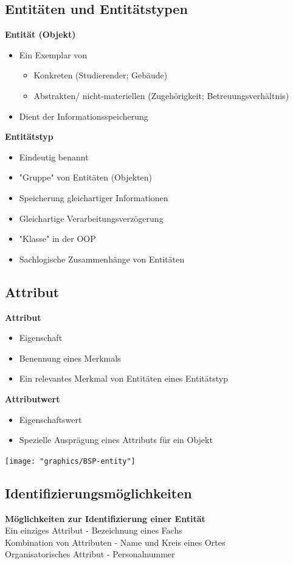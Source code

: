 \documentclass{scrreprt}
\newcommand\tab[1][1cm]{\hspace*{#1}}
\begin{document}
\subsection{Entitäten und Entitätstypen}
\textbf{Entität (Objekt)}
\begin{itemize}
  \item Ein Exemplar von
  \begin{itemize}
    \item Konkreten (Studierender; Gebäude)
    \item Abstrakten/ nicht-materiellen (Zugehörigkeit; Betreuungsverhältnis)
  \end{itemize}
  \item Dient der Informationsspeicherung
\end{itemize}
\textbf{Entitätstyp}
\begin{itemize}
  \item Eindeutig benannt
  \item "Gruppe" von Entitäten (Objekten)
  \item Speicherung gleichartiger Informationen
  \item Gleichartige Verarbeitungsverzögerung
  \item "Klasse" in der OOP
  \item Sachlogische Zusammenhänge von Entitäten 
\end{itemize}
\subsection{Attribut}
\textbf{Attribut}
\begin{itemize}
  \item Eigenschaft
  \item Benennung eines Merkmals
  \item Ein relevantes Merkmal von Entitäten eines Entitätstyp
\end{itemize}
\textbf{Attributwert}
\begin{itemize}
  \item Eigenschaftswert
  \item Spezielle Ausprägung eines Attributs für ein Objekt
\end{itemize}
\texttt{[image: "graphics/BSP-entity"]}
\subsection{Identifizierungsmöglichkeiten}
\textbf{Möglichkeiten zur Identifizierung einer Entität}
\\\tab Ein einziges Attribut - Bezeichnung eines Fachs
\\\tab Kombination von Attributen - Name und Kreis eines Ortes
\\\tab Organisatorisches Attribut - Personalnummer
\end{document}
